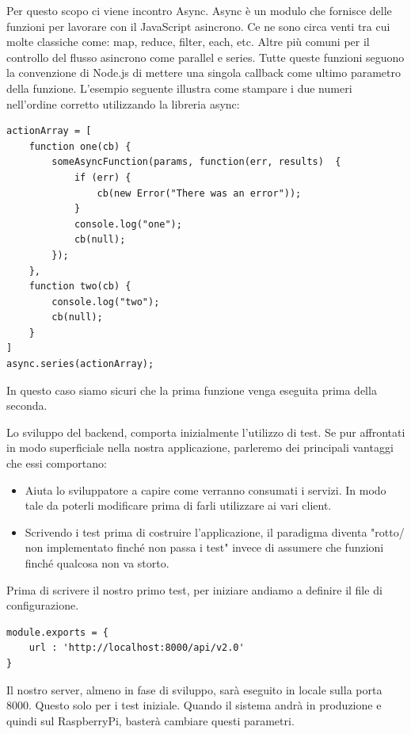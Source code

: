 Per questo scopo ci viene incontro Async.
Async è un modulo che fornisce delle funzioni per lavorare con il JavaScript asincrono.
Ce ne sono circa venti tra cui molte classiche come: map, reduce, filter, each, etc. 
Altre più comuni per il controllo del flusso asincrono come parallel e series.
Tutte queste funzioni seguono la convenzione di Node.js di mettere una singola callback come ultimo parametro della funzione. 
L'esempio seguente illustra come stampare i due numeri nell'ordine corretto utilizzando la libreria async:

\begin{lstlisting}[caption={operazioni sincrone}, style=javaScriptCode]
actionArray = [
	function one(cb) {
		someAsyncFunction(params, function(err, results)  {
			if (err) {
				cb(new Error("There was an error"));
			}
			console.log("one");
			cb(null);
		});
	},
	function two(cb) {
		console.log("two");
		cb(null);
	}
]
async.series(actionArray);
\end{lstlisting}

In questo caso siamo sicuri che la prima funzione venga eseguita prima della seconda.

Lo sviluppo del backend, comporta inizialmente l'utilizzo di test. Se pur affrontati in modo superficiale nella nostra applicazione, parleremo dei principali vantaggi che essi comportano:
\begin{itemize}
\item Aiuta lo sviluppatore a capire come verranno consumati i servizi. In modo tale da poterli modificare prima di farli utilizzare ai vari client.
\item Scrivendo i test prima di costruire l'applicazione, il paradigma diventa "rotto/ non implementato finché non passa i test" invece di assumere che funzioni finché qualcosa non va storto.
\end{itemize}

Prima di scrivere il nostro primo test, per iniziare andiamo a definire il file di configurazione.
 
\begin{lstlisting}[caption={test/config/test\_config.js}, style=javaScriptCode]
module.exports = {
	url : 'http://localhost:8000/api/v2.0'
}
\end{lstlisting}

Il nostro server, almeno in fase di sviluppo, sarà eseguito in locale sulla porta 8000. Questo solo per i test iniziale. 
Quando il sistema andrà in produzione e quindi sul RaspberryPi, basterà cambiare questi parametri.

